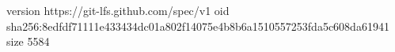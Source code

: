 version https://git-lfs.github.com/spec/v1
oid sha256:8edfdf71111e433434dc01a802f14075e4b8b6a1510557253fda5c608da61941
size 5584
